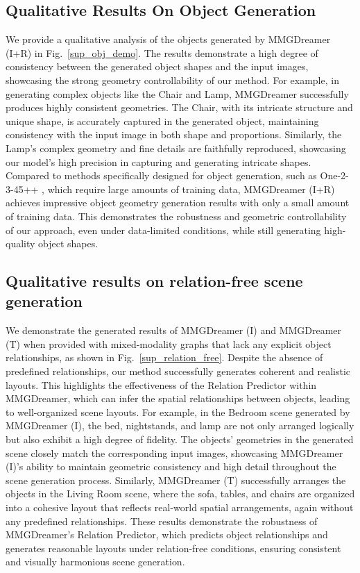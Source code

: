 \subsection{Qualitative Results On Object Generation}
We provide a qualitative analysis of the objects generated by MMGDreamer (I+R) in Fig.~\ref{sup_obj_demo}. 
The results demonstrate a high degree of consistency between the generated object shapes and the input images, showcasing the strong geometry controllability of our method.
For example, in generating complex objects like the Chair and Lamp, MMGDreamer successfully produces highly consistent geometries.
The Chair, with its intricate structure and unique shape, is accurately captured in the generated object, maintaining consistency with the input image in both shape and proportions. Similarly, the Lamp's complex geometry and fine details are faithfully reproduced, showcasing our model's high precision in capturing and generating intricate shapes.
Compared to methods specifically designed for object generation, such as One-2-3-45++ \cite{liu2024one}, which require large amounts of training data, MMGDreamer (I+R) achieves impressive object geometry generation results with only a small amount of training data.
This demonstrates the robustness and geometric controllability of our approach, even under data-limited conditions, while still generating high-quality object shapes.



\subsection{Qualitative results on relation-free scene generation}
We demonstrate the generated results of MMGDreamer (I) and MMGDreamer (T) when provided with mixed-modality graphs that lack any explicit object relationships, as shown in Fig.~\ref{sup_relation_free}.
Despite the absence of predefined relationships, our method successfully generates coherent and realistic layouts. This highlights the effectiveness of the Relation Predictor within MMGDreamer, which can infer the spatial relationships between objects, leading to well-organized scene layouts.
For example, in the Bedroom scene generated by MMGDreamer (I), the bed, nightstands, and lamp are not only arranged logically but also exhibit a high degree of fidelity. The objects' geometries in the generated scene closely match the corresponding input images, showcasing MMGDreamer (I)'s ability to maintain geometric consistency and high detail throughout the scene generation process. Similarly, MMGDreamer (T) successfully arranges the objects in the Living Room scene, where the sofa, tables, and chairs are organized into a cohesive layout that reflects real-world spatial arrangements, again without any predefined relationships.
These results demonstrate the robustness of MMGDreamer’s Relation Predictor, which predicts object relationships and generates reasonable layouts under relation-free conditions, ensuring consistent and visually harmonious scene generation.

